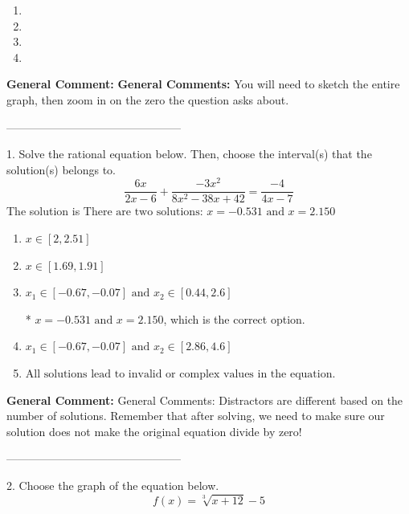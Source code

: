 \documentclass{extbook}[14pt]
\begin{document}
\begin{enumerate}[label=\Alph*.] 
\item   
\item   
\item   
\item   
\end{enumerate} 
 
\textbf{General Comment:} \textbf{General Comments:} You will need to sketch the entire graph, then zoom in on the zero the question asks about. 

-----------------------------------------------

1. Solve the rational equation below. Then, choose the interval(s) that the solution(s) belongs to.
\[ \frac{6x}{2x -6} + \frac{-3x^{2}}{8x^{2} -38 x + 42} = \frac{-4}{4x -7} \] 
The solution is $ \text{There are two solutions: } x = -0.531 \text{ and } x = 2.150 $ 

\begin{enumerate}[label=\Alph*.] 
\item $ x \in [2,2.51] $ 

  
\item $ x \in [1.69,1.91] $ 

  
\item $ x_1 \in [-0.67, -0.07] \text{ and } x_2 \in [0.44,2.6] $ 

 * $x = -0.531 \text{ and } x = 2.150$, which is the correct option. 
\item $ x_1 \in [-0.67, -0.07] \text{ and } x_2 \in [2.86,4.6] $ 

  
\item $ \text{All solutions lead to invalid or complex values in the equation.} $ 

  
\end{enumerate} 
 
\textbf{General Comment:} General Comments: Distractors are different based on the number of solutions. Remember that after solving, we need to make sure our solution does not make the original equation divide by zero! 

-----------------------------------------------

2. Choose the graph of the equation below.
\[ f(x) = \sqrt[3]{x + 12} - 5 \] 
\end{document}
